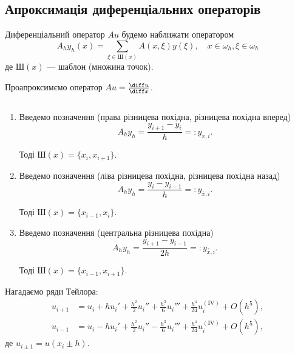 \subsection{Апроксимація диференціальних операторів}

Диференціальний оператор $A u$ будемо наближати оператором 
\begin{equation}
    \label{eq:4.3.1}
    A_h y_h (x) = \sum_{\xi \in \text{Ш}(x)} A(x, \xi) y(\xi), \quad x \in \omega_h, \xi \in \omega_h
\end{equation}
де $\text{Ш}(x)$ --- шаблон (множина точок).

\begin{example}
    Проапроксимємо оператор $A u = \frac{\diff u}{\diff x}$. 
\end{example}
\begin{solution}
    $\left.\right.$
    \begin{enumerate}
        \item Введемо позначення (права різницева похідна, різницева похідна вперед)
        \begin{equation}
            \label{eq:4.3.2}
            A_h y_h = \frac{y_{i + 1} - y_i}{h} =: y_{x, i}.
        \end{equation}

        Тоді $\text{Ш}(x) = \{x_i, x_{i + 1}\}$.

        \item Введемо позначення (ліва різницева похідна, різницева похідна назад)
        \begin{equation}
            \label{eq:4.3.3}
            A_h y_h = \frac{y_i - y_{i - 1}}{h} =: y_{\bar x, i}.
        \end{equation}

        Тоді $\text{Ш}(x) = \{x_{i - 1}, x_i\}$.

        \item Введемо позначення (центральна різницева похідна)
        \begin{equation}
            \label{eq:4.3.4}
            A_h y_h = \frac{y_{i + 1} - y_{i - 1}}{2 h} =: y_{\overset{\circ}{x}, i}.
        \end{equation}

        Тоді $\text{Ш}(x) = \{x_{i - 1}, x_{i + 1}\}$.
    \end{enumerate}

    \begin{remark}
        Нагадаємо ряди Тейлора:
        \begin{align*}
            u_{i + 1} &= u_i + h u_i' + \frac{h^2}{2} u_i'' + \frac{h^3}{6} u_i'''  + \frac{h^4}{24} u_i^{(\text{IV})} + O(h^5), \\
            u_{i - 1} &= u_i - h u_i' + \frac{h^2}{2} u_i'' - \frac{h^3}{6} u_i'''  + \frac{h^4}{24} u_i^{(\text{IV})} + O(h^5),
        \end{align*}
        де $u_{i \pm 1} = u(x_i \pm h)$.
    \end{remark}


\end{solution}
